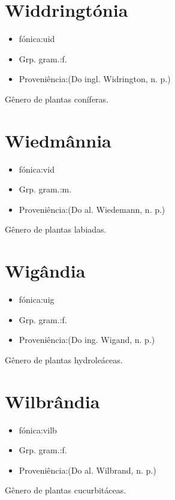 \documentclass{article}
\begin{document}
\section{Widdringtónia}
\begin{itemize}
\item {fónica:uid}
\end{itemize}
\begin{itemize}
\item {Grp. gram.:f.}
\end{itemize}
\begin{itemize}
\item {Proveniência:(Do ingl. \textunderscore Widrington\textunderscore , n. p.)}
\end{itemize}
Gênero de plantas coníferas.
\section{Wiedmânnia}
\begin{itemize}
\item {fónica:vid}
\end{itemize}
\begin{itemize}
\item {Grp. gram.:m.}
\end{itemize}
\begin{itemize}
\item {Proveniência:(Do al. \textunderscore Wiedemann\textunderscore , n. p.)}
\end{itemize}
Gênero de plantas labiadas.
\section{Wigândia}
\begin{itemize}
\item {fónica:uig}
\end{itemize}
\begin{itemize}
\item {Grp. gram.:f.}
\end{itemize}
\begin{itemize}
\item {Proveniência:(Do ing. \textunderscore Wigand\textunderscore , n. p.)}
\end{itemize}
Gênero de plantas hydroleáceas.
\section{Wilbrândia}
\begin{itemize}
\item {fónica:vilb}
\end{itemize}
\begin{itemize}
\item {Grp. gram.:f.}
\end{itemize}
\begin{itemize}
\item {Proveniência:(Do al. \textunderscore Wilbrand\textunderscore , n. p.)}
\end{itemize}
Gênero de plantas cucurbitáceas.
\end{document}

